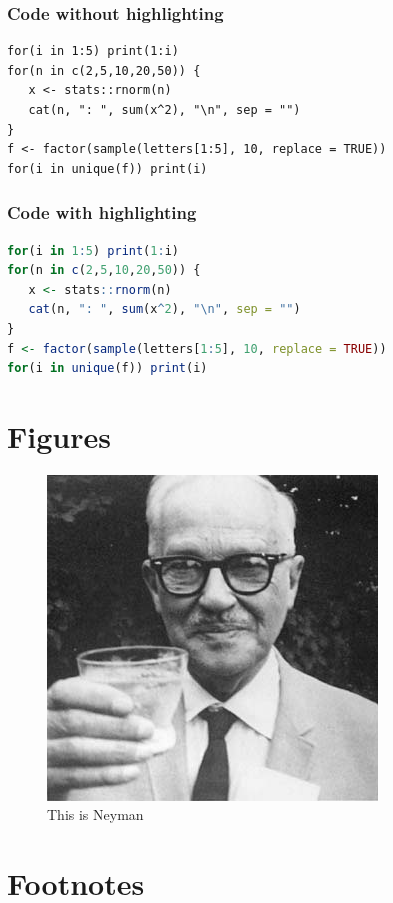 \documentclass{article}
\begin{document}
\subsubsection{Code without highlighting}

\begin{lstlisting}
for(i in 1:5) print(1:i)
for(n in c(2,5,10,20,50)) {
   x <- stats::rnorm(n)
   cat(n, ": ", sum(x^2), "\n", sep = "")
}
f <- factor(sample(letters[1:5], 10, replace = TRUE))
for(i in unique(f)) print(i)
\end{lstlisting}

\subsubsection{Code with highlighting}

\begin{lstlisting}[language=R]
for(i in 1:5) print(1:i)
for(n in c(2,5,10,20,50)) {
   x <- stats::rnorm(n)
   cat(n, ": ", sum(x^2), "\n", sep = "")
}
f <- factor(sample(letters[1:5], 10, replace = TRUE))
for(i in unique(f)) print(i)
\end{lstlisting}

\section{Figures}

\begin{figure}
\centering
\includegraphics{example-latex/neyman.jpg}
\caption{This is Neyman}
\end{figure}

\section{Footnotes}
\end{document}
